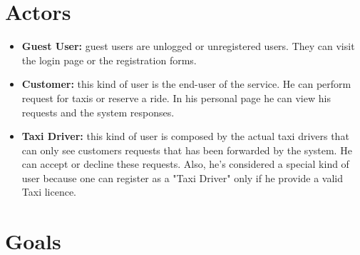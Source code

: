 \documentclass{report}
\begin{document}
	\section{Actors}
		\begin{itemize}
		  \item \textbf{Guest User:}\label{sec:normaluser} guest users are unlogged or unregistered users. They can visit the login page or the registration forms.

		  \item \textbf{Customer:}\label{sec:customer} this kind of user is the end-user of the service. He can perform request for taxis or reserve a ride. In his personal page he can view his requests and the system responses.

		  \item \textbf{Taxi Driver:}\label{sec:tdriver} this kind of user is composed by the actual taxi drivers that can only see customers requests that has been forwarded by the system. He can accept or decline these requests. Also, he's considered a special kind of user because one can register as a "Taxi Driver" only if he provide a valid Taxi licence.
		\end{itemize}

	\section{Goals}
\end{document}

